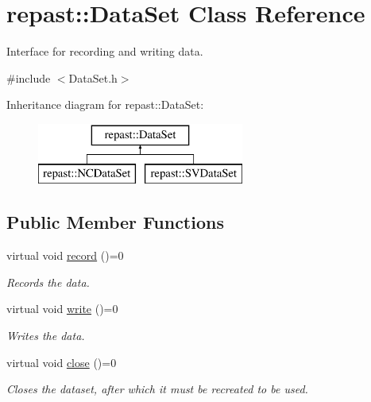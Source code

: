 \hypertarget{classrepast_1_1_data_set}{\section{repast\-:\-:Data\-Set Class Reference}
\label{classrepast_1_1_data_set}
}


Interface for recording and writing data.  




{\ttfamily \#include $<$Data\-Set.\-h$>$}

Inheritance diagram for repast\-:\-:Data\-Set\-:\begin{figure}[H]
\begin{center}
\leavevmode
\includegraphics[height=2.000000cm]{classrepast_1_1_data_set}
\end{center}
\end{figure}
\subsection*{Public Member Functions}
\begin{DoxyCompactItemize}
\item 
\hypertarget{classrepast_1_1_data_set_a80bbb8457ca1fae6aa79bed50b64a921}{virtual void \hyperlink{classrepast_1_1_data_set_a80bbb8457ca1fae6aa79bed50b64a921}{record} ()=0}\label{classrepast_1_1_data_set_a80bbb8457ca1fae6aa79bed50b64a921}

\begin{DoxyCompactList}\small\item\em Records the data. \end{DoxyCompactList}\item 
\hypertarget{classrepast_1_1_data_set_a3081affe6d19de1f98a319367c2a3eb6}{virtual void \hyperlink{classrepast_1_1_data_set_a3081affe6d19de1f98a319367c2a3eb6}{write} ()=0}\label{classrepast_1_1_data_set_a3081affe6d19de1f98a319367c2a3eb6}

\begin{DoxyCompactList}\small\item\em Writes the data. \end{DoxyCompactList}\item 
\hypertarget{classrepast_1_1_data_set_a285c971c8a6cfb17c54aa31490b44298}{virtual void \hyperlink{classrepast_1_1_data_set_a285c971c8a6cfb17c54aa31490b44298}{close} ()=0}\label{classrepast_1_1_data_set_a285c971c8a6cfb17c54aa31490b44298}

\begin{DoxyCompactList}\small\item\em Closes the dataset, after which it must be recreated to be used. \end{DoxyCompactList}\end{DoxyCompactItemize}



